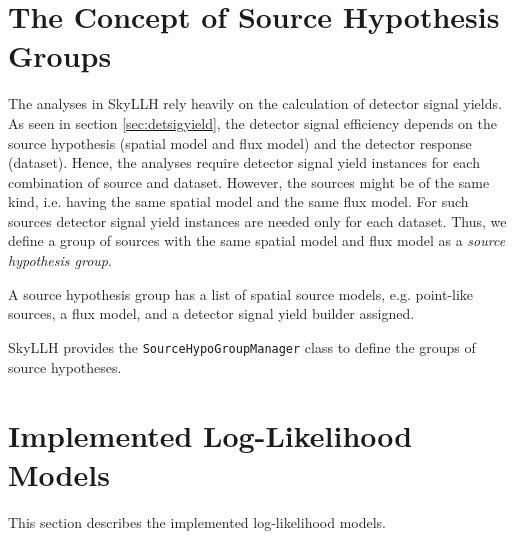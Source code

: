 \documentclass{article}
\newcommand{\code}[1]{\texttt{#1}}
\newcommand{\class}[1]{\colorbox{blue!30}{\code{#1}}}
\begin{document}
\section{The Concept of Source Hypothesis Groups}

The analyses in SkyLLH rely heavily on the calculation of detector signal
yields. As seen in section \ref{sec:detsigyield}, the detector signal
efficiency depends on the source hypothesis (spatial model and flux model)
and the detector response (dataset). Hence, the analyses require detector signal
yield instances for each combination of source and dataset.
However, the sources might be of the same kind, i.e. having the same spatial
model and the same flux model. For such sources detector signal yield
instances are needed only for each dataset. Thus, we define a group
of sources with the same spatial model and flux model as a
\emph{source hypothesis group}.

A source hypothesis group has a list of spatial source models, e.g. point-like
sources, a flux model, and a detector signal yield builder assigned.

SkyLLH provides the \class{SourceHypoGroupManager} class to define the groups of
source hypotheses.

\section{Implemented Log-Likelihood Models}
This section describes the implemented log-likelihood models.
\cite{TimeDepPSSearchMethods2010}





\end{document}

